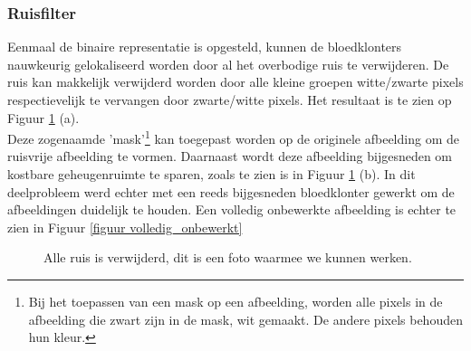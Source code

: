 \documentclass[a4paper,kulak]{kulakarticle}
\begin{document}
\subsubsection{Ruisfilter}
Eenmaal de binaire representatie is opgesteld, kunnen de bloedklonters nauwkeurig gelokaliseerd worden door al het overbodige ruis te verwijderen. De ruis kan makkelijk verwijderd worden door alle kleine groepen witte/zwarte pixels respectievelijk te vervangen door zwarte/witte pixels. Het resultaat is te zien op Figuur \ref{figuur ruisfilter} (a). \\
Deze zogenaamde 'mask'\footnote{Bij het toepassen van een mask op een afbeelding, worden alle pixels in de afbeelding die zwart zijn in de mask, wit gemaakt. De andere pixels behouden hun kleur.} kan toegepast worden op de originele afbeelding om de ruisvrije afbeelding te vormen. Daarnaast wordt deze afbeelding bijgesneden om kostbare geheugenruimte te sparen, zoals te zien is in Figuur \ref{figuur ruisfilter} (b). In dit deelprobleem werd echter met een reeds bijgesneden bloedklonter gewerkt om de afbeeldingen duidelijk te houden. Een volledig onbewerkte afbeelding is echter te zien in Figuur \ref{figuur volledig_onbewerkt}

\begin{figure}[H]
	\centering
	\qquad
	
	\caption{Alle ruis is verwijderd, dit is een foto waarmee we kunnen werken.}
	\label{figuur ruisfilter}
\end{figure}
\end{document}
